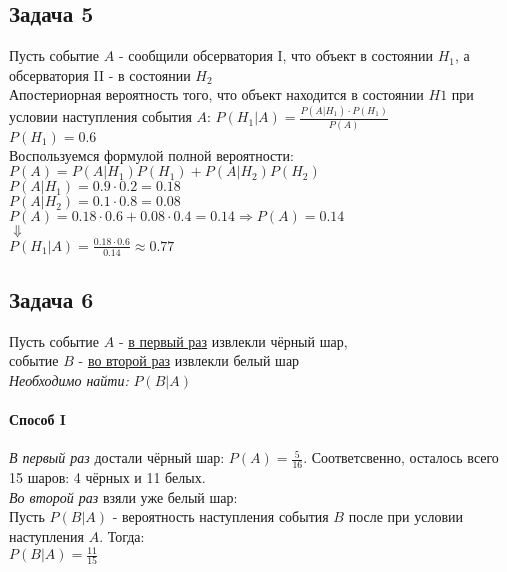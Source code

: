 \documentclass[12pt]{article}
\begin{document}
		\subsection*{Задача 5}
			Пусть событие $A$ - сообщили обсерватория I, что объект в состоянии $H_{1}$, а обсерватория II - в состоянии $H_{2}$\\
			Апостериорная вероятность того, что объект находится в состоянии $H1$ при условии наступления события $A$: $P(H_{1}|A) = \frac{P(A|H_{1})\cdot P(H_{1})}{P(A)}$\\
			$P(H_{1}) = 0.6$ \\
			Воспользуемся формулой полной вероятности: $P(A) = P(A|H_{1})P(H_{1}) + P(A|H_{2})P(H_{2})$\\
			$P(A|H_{1}) = 0.9\cdot 0.2 = 0.18$\\
			$P(A|H_{2}) = 0.1\cdot 0.8 = 0.08$\\
			$P(A) = 0.18\cdot 0.6 + 0.08\cdot 0.4 = 0.14 \Rightarrow P(A) = 0.14$ \\
			$\Downarrow$\\
			$P(H_{1}|A) = \frac{0.18\cdot 0.6}{0.14} \approx 0.77$\\
		\subsection*{Задача 6}
			Пусть событие $A$ - \underline{в первый раз} извлекли чёрный шар, \\
			событие $B$ - \underline{во второй раз} извлекли белый шар\\
			\textit{Необходимо найти:} $P(B|A)$
			\paragraph*{Способ I}
				\textit{В первый раз} достали чёрный шар: $P(A) = \frac{5}{16}$. Соответсвенно, осталось всего 15 шаров: 4 чёрных и 11 белых. \\
				\textit{Во второй раз} взяли уже белый шар:\\
				Пусть $P(B|A)$ - вероятность наступления события $B$ после при условии наступления $A$. Тогда:\\
				\underline{$P(B|A) = \frac{11}{15}$}\\
\end{document}
